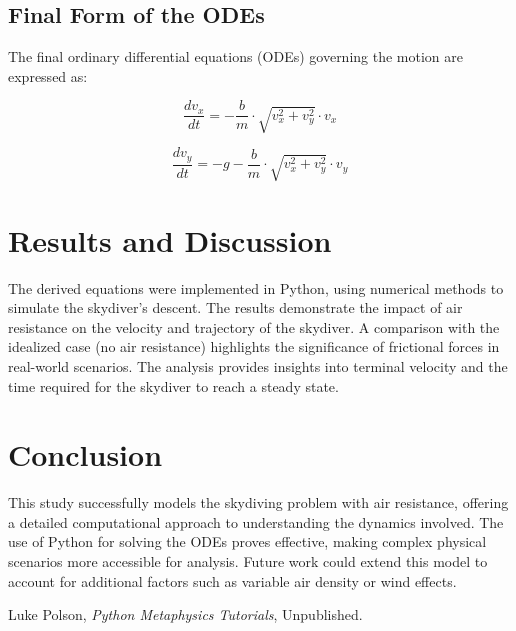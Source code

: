\documentclass{article}
\begin{document}
\subsection*{Final Form of the ODEs}

The final ordinary differential equations (ODEs) governing the motion are expressed as:

\[
\frac{dv_{x}}{dt} = -\frac{b}{m} \cdot \sqrt{v_{x}^2 + v_{y}^2} \cdot v_{x}
\]

\[
\frac{dv_{y}}{dt} = -g - \frac{b}{m} \cdot \sqrt{v_{x}^2 + v_{y}^2} \cdot v_{y}
\]

\section*{Results and Discussion}

The derived equations were implemented in Python, using numerical methods to simulate the skydiver's descent. The results demonstrate the impact of air resistance on the velocity and trajectory of the skydiver. A comparison with the idealized case (no air resistance) highlights the significance of frictional forces in real-world scenarios. The analysis provides insights into terminal velocity and the time required for the skydiver to reach a steady state.

\section*{Conclusion}

This study successfully models the skydiving problem with air resistance, offering a detailed computational approach to understanding the dynamics involved. The use of Python for solving the ODEs proves effective, making complex physical scenarios more accessible for analysis. Future work could extend this model to account for additional factors such as variable air density or wind effects.

\begin{thebibliography}{9}

Luke Polson,
\textit{Python Metaphysics Tutorials},
Unpublished.
    
\end{thebibliography}
\end{document}
